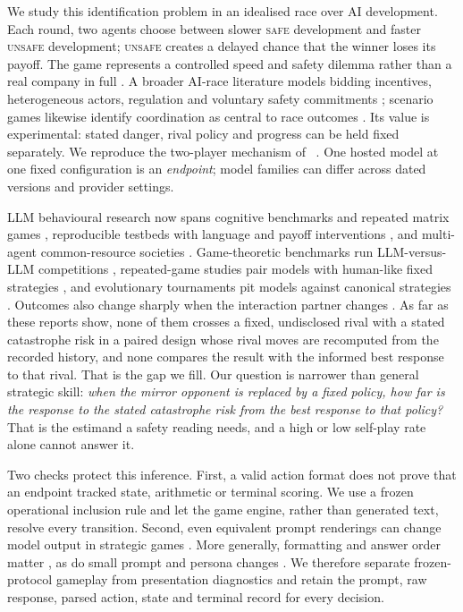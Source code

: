 \documentclass{article}
\newcommand{\Safe}{\textsc{safe}}
\newcommand{\Unsafe}{\textsc{unsafe}}
\DeclareRobustCommand{\citep}[1]{\cite{#1}}
\DeclareRobustCommand{\citet}[1]{\citeauthor{#1}~\shortcite{#1}}
\begin{document}
We study this identification problem in an idealised race over AI development. Each
round, two agents choose between slower \Safe{} development and faster
\Unsafe{} development; \Unsafe{} creates a delayed chance that the winner loses
its payoff. The game represents a controlled speed and safety dilemma rather than a
real company in full \citep{ai_race_for_strategic_advantage,racing_to_the_precipice}.
A broader AI-race literature models bidding incentives, heterogeneous actors,
regulation and voluntary safety commitments
\citep{han2019modelling,to_regulate_or_not,artificial_intelligence_development_races,han2022voluntary};
scenario games likewise identify coordination as central to race outcomes
\citep{gruetzemacher2025strategic}.
Its value is experimental: stated danger, rival policy and progress can be held
fixed separately. We reproduce the two-player mechanism of
\citet{falling_behind_unsafe}. One hosted model at one fixed configuration is an
\emph{endpoint}; model families can differ across dated versions and provider
settings.

LLM behavioural research now spans cognitive benchmarks and repeated
matrix games \citep{codaFornoCogBench2024,playing_repeated_games_with_llms},
reproducible testbeds with language and payoff interventions
\citep{buscemiFAIRGAME2025,huynhUnderstanding2025,huynhPayoffScaling2026}, and
multi-agent common-resource societies \citep{piattiGovSim2024}.
Game-theoretic benchmarks run LLM-versus-LLM competitions
\citep{duanGTBench2024}, repeated-game studies pair models with human-like
fixed strategies \citep{playing_repeated_games_with_llms}, and evolutionary
tournaments pit models against canonical strategies
\citep{payneStrategicIntelligence2025}. Outcomes also change sharply when the
interaction partner changes \citep{lekeasNashSuppression2026}. As far as these
reports show, none of them crosses a fixed, undisclosed rival with a stated
catastrophe risk in a paired design whose rival moves are recomputed from the
recorded history, and none compares the result with the informed best response to
that rival. That is the gap we fill. Our question is narrower than general
strategic skill: \emph{when the mirror opponent is replaced by a fixed policy,
how far is the response to the stated catastrophe risk from the best response to
that policy?} That is the estimand a safety reading needs, and a high or low
self-play rate alone cannot answer it.

Two checks protect this inference. First, a valid action format does not prove
that an endpoint tracked state, arithmetic or terminal scoring. We use a frozen
operational inclusion rule and let the game engine, rather than generated text,
resolve every transition. Second, even equivalent prompt renderings can change
model output in strategic games
\citep{robinsonBurdenFraming2025,mousaviDavoudiEtAl2026}. More generally,
formatting and answer order matter
\citep{sclarPromptFormatting2024,pezeshkpourOptionOrder2024,weiSelectionBias2024},
as do small prompt and persona changes
\citep{salinasButterfly2024,zhengPersona2024,herrStrategicBias2024}.
We therefore separate frozen-protocol gameplay from presentation diagnostics and
retain the prompt, raw response, parsed action, state and terminal record for
every decision.
\end{document}
